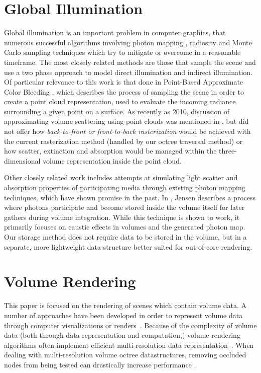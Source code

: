 \documentclass[12pt]{ucthesis}
\begin{document}
\section{Global Illumination}
Global illumination is an important problem in computer graphics, that numerous successful algorithms involving photon mapping \cite{Jensen:2009}, radiosity \cite{radiosity} and Monte Carlo sampling techniques \cite{monte_carlo} which try to mitigate or overcome in a reasonable timeframe.  The most closely related methods are those that sample the scene and use a two phase approach to model direct illumination and indirect illumination. Of particular relevance to this work is that done in Point-Based Approximate Color Bleeding \cite{christensen:2008}, which describes the process of sampling the scene in order to create a point cloud representation, used to evaluate the incoming radiance surrounding a given point on a surface.  As recently as 2010, discussion of approximating volume scattering using point clouds was mentioned in \cite{christensen:siggraph}, but did not offer how \textit{back-to-front or front-to-back rasterization} would be achieved with the current rasterization method (handled by our octree traversal method) or how scatter, extinction and absorption would be managed within the three-dimensional volume representation inside the point cloud.

Other closely related work includes attempts at simulating light scatter and absorption properties of participating media through existing photon mapping techniques, which have shown promise in the past.  In \cite{jensen:1998}, Jensen describes a process where photons participate and become stored inside the volume itself for later gathers during volume integration.  While this technique is shown to work, it primarily focuses on caustic effects in volumes and the generated photon map.  Our storage method does not require data to be stored in the volume, but in a separate, more lightweight data-structure better suited for out-of-core rendering.

\section{Volume Rendering}
This paper is focused on the rendering of scenes which contain volume data.  A number of approaches have been developed in order to represent volume data through computer visualizations or renders~\cite{levoy88}\cite{Kajiya84}.  Because of the complexity of volume data (both through data representation and computation,) volume rendering algorithms often implement efficient multi-resolution data representation~\cite{Westermann94}\cite{Levoy90}.  When dealing with multi-resolution volume octree datastructures, removing occluded nodes from being tested can drastically increase performance \cite{guthe}.
\end{document}

